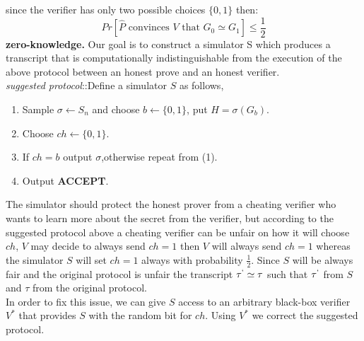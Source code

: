 \documentclass[12pt,a4paper]{article}
\begin{document}
since the verifier has only two possible choices $\{0,1\}$ then:
$$Pr[\hat{P}\text{ convinces } V \text{ that }G_0\simeq G_1]\leq \frac{1}{2}$$
\textbf{zero-knowledge.}
Our goal is to construct a simulator S which produces a transcript that is computationally indistinguishable from the execution of the above protocol between an honest prove and an honest verifier.\\
\textit{suggested protocol}::Define a simulator $S$ as follows,\\
\begin{enumerate}	
	\item
	\begin{enumerate}
Sample $\sigma \longleftarrow S_n$ and choose $b \longleftarrow \{0,1\}$, put $H=\sigma(G_b)$.
\end{enumerate}
\item
\begin{enumerate}
Choose $ch \longleftarrow \{0,1\}$.
\end{enumerate}
\item
\begin{enumerate}
If $ch=b$ output $\sigma$,otherwise repeat from (1).
\end{enumerate}
\item
\begin{enumerate}
Output \textbf{ACCEPT}.
\end{enumerate}
\end{enumerate}
The simulator should protect the honest prover from a cheating verifier who wants to learn more about the secret from the verifier,  but according to the suggested protocol above a cheating verifier can be unfair on how it will choose $ch$, $V$ may decide to always send $ch=1$ then $V$ will always send $ch=1$ whereas the simulator $S$ will set $ch=1$ always with probability $\frac{1}{2}$. Since $S$ will be always fair and the original protocol is unfair the transcript $\tau^{`} \simeq  \tau$ such that $\tau^{`}$ from $S$ and $\tau$ from the original protocol.\\
In order to fix this issue, we can give $S$ access to an arbitrary black-box verifier $V^*$ that provides $S$ with the random bit for $ch$. Using $V^*$ we correct the suggested protocol.\\
\end{document}

